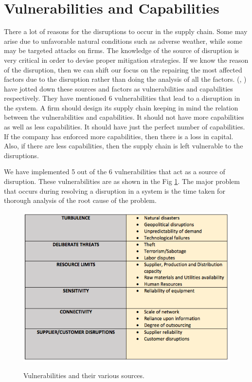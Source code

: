 \section{Vulnerabilities and Capabilities}

There a lot of reasons for the disruptions to occur in the supply chain. Some may arise due to unfavorable natural conditions such as adverse weather, while some may be targeted attacks on firms. The knowledge of the source of disruption is very critical in order to devise proper mitigation strategies. If we know the reason of the disruption, then we can shift our focus on the repairing the most affected factors due to the disruption rather than doing the analysis of all the factors.
 (\citeauthor{Pettit2010}, \citeyear{Pettit2010}) have jotted down these sources and factors as vulnerabilities and capabilities respectively. They have mentioned 6 vulnerabilities that lead to a disruption in the system. A firm should design its supply chain keeping in mind the relation between the vulnerabilities and capabilities. It should not have more capabilities as well as less capabilities. It should have just the perfect number of capabilities. If the company has enforced more capabilities, then there is a loss in capital. Also, if there are less capabilities, then the supply chain is left vulnerable to the disruptions.
 
We have implemented 5 out of the 6 vulnerabilities that act as a source of disruption. These vulnerabilities are as shown in the Fig \ref{Vulnerabilities}. The major problem that occurs during resolving a disruption in a system is the time taken for thorough analysis of the root cause of the problem.


\begin{figure}[H]
  \centering
  \includegraphics[width=6.5in]{figures/pdf/VNTS.png}\\
  \caption{Vulnerabilities and their various sources.}\label{Vulnerabilities}
\end{figure}


